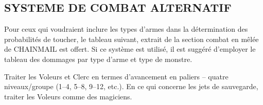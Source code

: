 \documentclass[11pt]{article}
\begin{document}
{%
\subsection*{SYSTEME DE COMBAT ALTERNATIF}
\label{combat-alternatif}

Pour ceux qui voudraient inclure les types d'armes dans la détermination des probabilités de toucher, le tableau suivant, extrait de la section \og combat en mêlée \fg{} de CHAINMAIL est offert. Si ce système est utilisé, il est suggéré d'employer le tableau des dommages par type d'arme et type de monstre.

Traiter les Voleurs et Clerc en termes d'avancement en paliers -- quatre niveaux/groupe (1--4, 5--8, 9--12, etc.). En ce qui concerne les jets de sauvegarde, traiter les Voleurs comme des magiciens.

\bigskip

}
\end{document}

